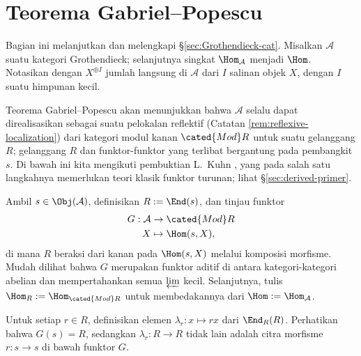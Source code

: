 \section{Teorema Gabriel--Popescu}\label{sec:GP}
Bagian ini melanjutkan dan melengkapi \S\ref{sec:Grothendieck-cat}.
Misalkan $\mathcal{A}$ suatu kategori Grothendieck; selanjutnya singkat
$\Hom_{\mathcal{A}}$ menjadi $\Hom$. Notasikan dengan $X^{\oplus I}$ jumlah
langsung di $\mathcal{A}$ dari $I$ salinan objek $X$, dengan $I$ suatu
himpunan kecil.

Teorema Gabriel--Popescu akan menunjukkan bahwa $\mathcal{A}$ selalu dapat direalisasikan sebagai suatu pelokalan reflektif (Catatan \ref{rem:reflexive-localization}) dari kategori modul kanan $\cated{Mod}R$ untuk suatu gelanggang $R$; gelanggang $R$ dan funktor-funktor yang terlibat bergantung pada pembangkit $s$. Di bawah ini kita mengikuti pembuktian L.\ Kuhn \cite{Ku94}, yang pada salah satu langkahnya memerlukan teori klasik funktor turunan; lihat \S\ref{sec:derived-primer}.

Ambil $s \in \Obj(\mathcal{A})$, definisikan $R := \End(s)$, dan tinjau funktor
\begin{align*}
	G: \mathcal{A} & \to \cated{Mod}R \\
	X & \mapsto \Hom(s, X),
\end{align*}
di mana $R$ beraksi dari kanan pada $\Hom(s, X)$ melalui komposisi morfisme. Mudah dilihat bahwa $G$ merupakan funktor aditif di antara kategori-kategori abelian dan mempertahankan semua $\varprojlim$ kecil. Selanjutnya, tulis $\Hom_R := \Hom_{\cated{Mod}R}$ untuk membedakannya dari $\Hom := \Hom_{\mathcal{A}}$.

Untuk setiap $r \in R$, definisikan elemen $\lambda_r: x \mapsto rx$ dari $\End_R(R)$. Perhatikan bahwa $G(s) = R$, sedangkan $\lambda_r: R \to R$ tidak lain adalah citra morfisme $r: s \to s$ di bawah funktor $G$.

